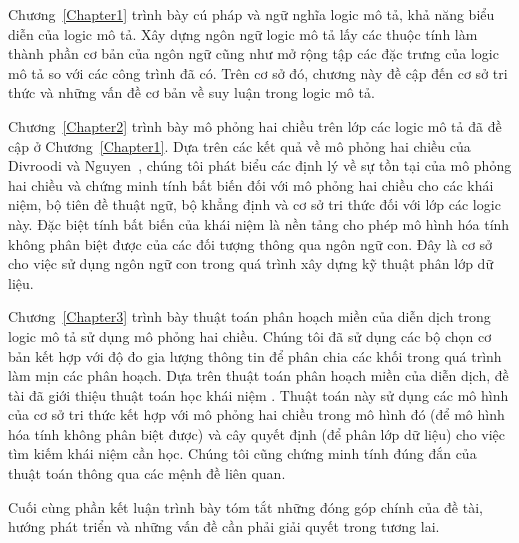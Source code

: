 Chương~\ref{Chapter1} trình bày cú pháp và ngữ nghĩa logic mô tả, khả năng biểu diễn của logic mô tả. Xây dựng ngôn ngữ logic mô tả lấy các thuộc tính làm thành phần cơ bản của ngôn ngữ cũng như mở rộng tập các đặc trưng của logic mô tả so với các công trình đã có. Trên cơ sở đó, chương này đề cập đến cơ sở tri thức và những vấn đề cơ bản về suy luận trong logic mô tả.
	
Chương~\ref{Chapter2} trình bày mô phỏng hai chiều trên lớp các logic mô tả đã đề cập ở Chương~\ref{Chapter1}. Dựa trên các kết quả về mô phỏng hai chiều của Divroodi và Nguyen~\cite{Divroodi2011B}, chúng tôi phát biểu các định lý về sự tồn tại của mô phỏng hai chiều và chứng minh tính bất biến đối với mô phỏng hai chiều cho các khái niệm, bộ tiên đề thuật ngữ, bộ khẳng định và cơ sở tri thức đối với lớp các logic này. Đặc biệt tính bất biến của khái niệm là nền tảng cho phép mô hình hóa tính không phân biệt được của các đối tượng thông qua ngôn ngữ con. Đây là cơ sở cho việc sử dụng ngôn ngữ con trong quá trình xây dựng kỹ thuật phân lớp dữ liệu.
	
Chương~\ref{Chapter3} trình bày thuật toán phân hoạch miền của diễn dịch trong logic mô tả sử dụng mô phỏng hai chiều. Chúng tôi đã sử dụng các bộ chọn cơ bản kết hợp với độ đo gia lượng thông tin để phân chia các khối trong quá trình làm mịn các phân hoạch. Dựa trên thuật toán phân hoạch miền của diễn dịch, đề tài đã giới thiệu thuật toán học khái niệm \BBCLearnS. Thuật toán này sử dụng các mô hình của cơ sở tri thức kết hợp với mô phỏng hai chiều trong mô hình đó (để mô hình hóa tính không phân biệt được) và cây quyết định (để phân lớp dữ liệu) cho việc tìm kiếm khái niệm cần học. Chúng tôi cũng chứng minh tính đúng đắn của thuật toán thông qua các mệnh đề liên quan.

Cuối cùng phần kết luận trình bày tóm tắt những đóng góp chính của đề tài, hướng phát triển và những vấn đề cần phải giải quyết trong tương lai.
\cleardoublepage